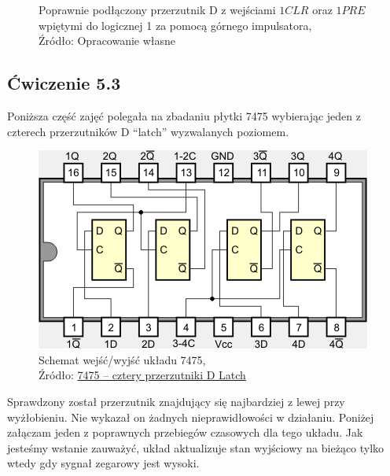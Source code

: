 \documentclass{article}
\begin{document}
\begin{figure}[!ht]
\begin{minipage}{.5\textwidth}
          \caption{Poprawnie podłączony przerzutnik D z wejściami $1CLR$ oraz $1PRE$ wpiętymi do logicznej 1 za pomocą górnego impulsatora,
          \\Źródło: Opracowanie własne}
        \end{minipage}
      \end{figure}
      \pagebreak
  
    \subsection{Ćwiczenie 5.3}
      Poniższa część zajęć polegała na zbadaniu płytki 7475 wybierając jeden z czterech przerzutników D “latch” wyzwalanych poziomem.


      \begin{figure}[!ht]
        \centering
        \includegraphics[scale=0.45]{grafiki/7475.png}
        \caption{Schemat wejść/wyjść układu 7475,
        \\Źródło: \href{https://eduinf.waw.pl/inf/prg/010_uc/7475.php}{7475 -- cztery przerzutniki D Latch}}
      \end{figure}

      Sprawdzony został przerzutnik znajdujący się najbardziej z lewej przy wyżłobieniu. Nie wykazał on żadnych nieprawidłowości w działaniu. Poniżej załączam jeden z poprawnych przebiegów czasowych dla tego układu. Jak jesteśmy wstanie zauważyć, układ aktualizuje stan wyjściowy na bieżąco tylko wtedy gdy sygnał zegarowy jest wysoki.
\end{document}
